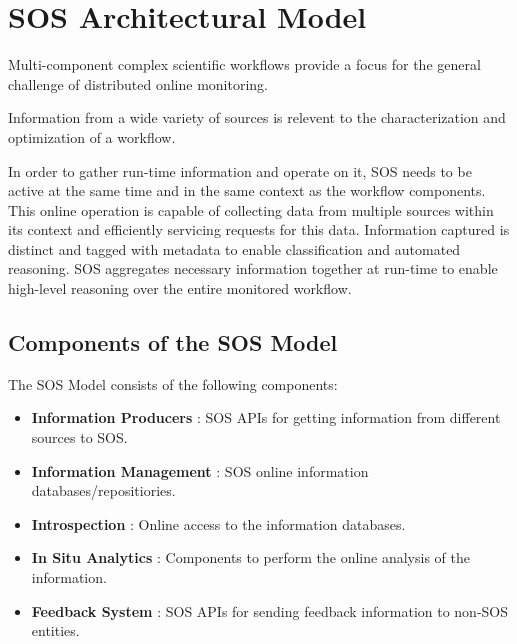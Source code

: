 
\section{SOS Architectural Model}
%
%
Multi-component complex scientific workflows provide a focus for the
general challenge of distributed online monitoring.
%
%

Information from a wide variety of sources is relevent to the
characterization and optimization of a workflow.
%
\par
%
In order to gather run-time information and operate on it, SOS needs
to be active at the same time and in the same context as the workflow
components.
%
This online operation is capable of collecting data from multiple
sources within its context and efficiently servicing requests
for this data.
%
Information captured is distinct and tagged with metadata to enable
classification and automated reasoning.
%
SOS aggregates necessary information together at run-time to
enable high-level reasoning over the entire monitored workflow.
%


\subsection{Components of the SOS Model}
%
The SOS Model consists of the following components:
%
\begin{itemize}
%
\item \textbf{Information Producers} : SOS APIs for getting
  information from different sources to SOS.
%
\item \textbf{Information Management} : SOS online
  information databases/repositiories.
%
\item \textbf{Introspection} : Online access to the
  information databases.
%
\item \textbf{In Situ Analytics} : Components to perform the online
  analysis of the information.
%
\item \textbf{Feedback System} : SOS APIs for sending feedback
  information to non-SOS entities.
%
\end{itemize}


